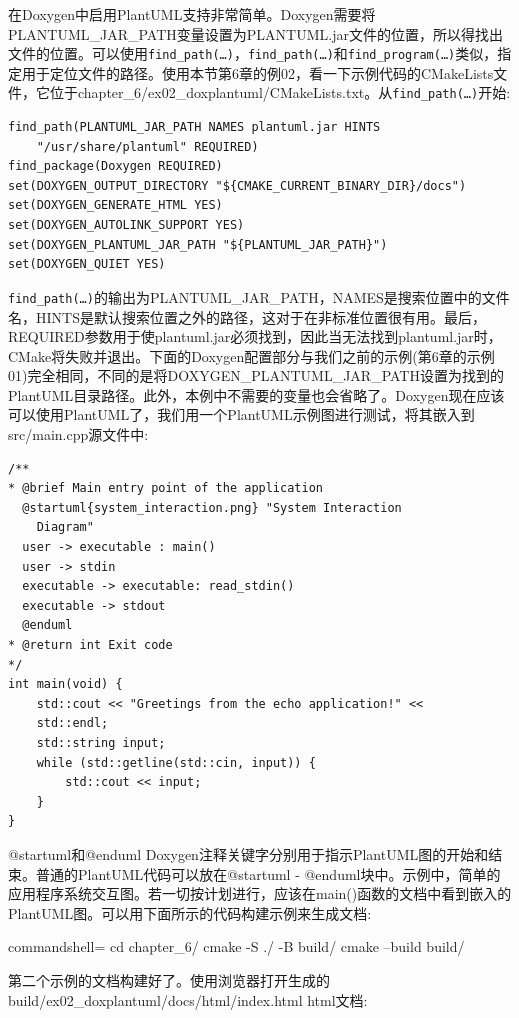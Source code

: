 在Doxygen中启用PlantUML支持非常简单。Doxygen需要将PLANTUML\_JAR\_PATH变量设置为PLANTUML.jar文件的位置，所以得找出文件的位置。可以使用\texttt{find\_path(…)}，\texttt{find\_path(…)}和\texttt{find\_program(…)}类似，指定用于定位文件的路径。使用本节第6章的例02，看一下示例代码的CMakeLists文件，它位于chapter\_6/ex02\_doxplantuml/CMakeLists.txt。从\texttt{find\_path(…)}开始:

\begin{lstlisting}[style=styleCMake]
find_path(PLANTUML_JAR_PATH NAMES plantuml.jar HINTS
	"/usr/share/plantuml" REQUIRED)
find_package(Doxygen REQUIRED)
set(DOXYGEN_OUTPUT_DIRECTORY "${CMAKE_CURRENT_BINARY_DIR}/docs")
set(DOXYGEN_GENERATE_HTML YES)
set(DOXYGEN_AUTOLINK_SUPPORT YES)
set(DOXYGEN_PLANTUML_JAR_PATH "${PLANTUML_JAR_PATH}")
set(DOXYGEN_QUIET YES)
\end{lstlisting}

\texttt{find\_path(…)}的输出为PLANTUML\_JAR\_PATH，NAMES是搜索位置中的文件名，HINTS是默认搜索位置之外的路径，这对于在非标准位置很有用。最后，REQUIRED参数用于使plantuml.jar必须找到，因此当无法找到plantuml.jar时，CMake将失败并退出。下面的Doxygen配置部分与我们之前的示例(第6章的示例01)完全相同，不同的是将DOXYGEN\_PLANTUML\_JAR\_PATH设置为找到的PlantUML目录路径。此外，本例中不需要的变量也会省略了。Doxygen现在应该可以使用PlantUML了，我们用一个PlantUML示例图进行测试，将其嵌入到src/main.cpp源文件中:

\begin{lstlisting}[style=styleCXX]
/**
* @brief Main entry point of the application
  @startuml{system_interaction.png} "System Interaction
    Diagram"
  user -> executable : main()
  user -> stdin
  executable -> executable: read_stdin()
  executable -> stdout
  @enduml
* @return int Exit code
*/
int main(void) {
	std::cout << "Greetings from the echo application!" <<
	std::endl;
	std::string input;
	while (std::getline(std::cin, input)) {
		std::cout << input;
	}
}
\end{lstlisting}

@startuml和@enduml Doxygen注释关键字分别用于指示PlantUML图的开始和结束。普通的PlantUML代码可以放在@startuml - @enduml块中。示例中，简单的应用程序系统交互图。若一切按计划进行，应该在main()函数的文档中看到嵌入的PlantUML图。可以用下面所示的代码构建示例来生成文档:
 
\begin{tcblisting}{commandshell={}}
cd chapter_6/
cmake -S ./ -B build/
cmake --build build/
\end{tcblisting}

第二个示例的文档构建好了。使用浏览器打开生成的build/ex02\_doxplantuml/docs/html/index.html html文档:


